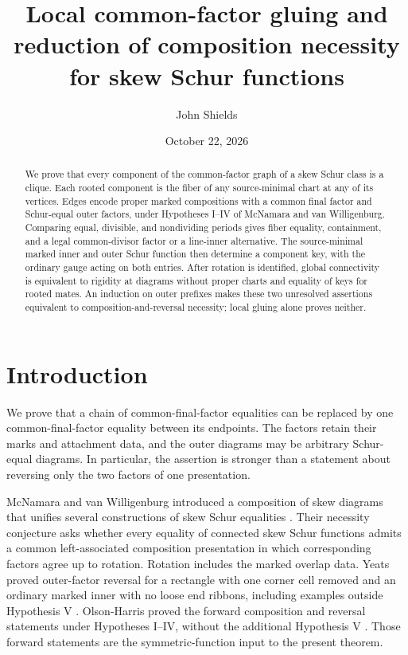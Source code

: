 \documentclass[11pt,a4paper]{amsart}
\title[Local common-factor gluing and necessity reduction]{Local common-factor gluing and reduction of composition necessity for skew Schur functions}
\author{John Shields}
\date{October 22, 2026}
\numberwithin{equation}{section}
\theoremstyle{plain}
\theoremstyle{definition}
\begin{document}
\begin{abstract}
We prove that every component of the common-factor graph of a skew Schur class is a clique.  Each rooted component is the fiber of any source-minimal chart at any of its vertices.  Edges encode proper marked compositions with a common final factor and Schur-equal outer factors, under Hypotheses I--IV of McNamara and van Willigenburg.  Comparing equal, divisible, and nondividing periods gives fiber equality, containment, and a legal common-divisor factor or a line-inner alternative.  The source-minimal marked inner and outer Schur function then determine a component key, with the ordinary gauge acting on both entries.  After rotation is identified, global connectivity is equivalent to rigidity at diagrams without proper charts and equality of keys for rooted mates.  An induction on outer prefixes makes these two unresolved assertions equivalent to composition-and-reversal necessity; local gluing alone proves neither.
\end{abstract}

\maketitle

\section{Introduction}\label{sec:introduction}

We prove that a chain of common-final-factor equalities can be replaced by one common-final-factor equality between its endpoints.  The factors retain their marks and attachment data, and the outer diagrams may be arbitrary Schur-equal diagrams.  In particular, the assertion is stronger than a statement about reversing only the two factors of one presentation.

McNamara and van Willigenburg introduced a composition of skew diagrams that unifies several constructions of skew Schur equalities \cite[Def.~3.11]{McNamara2009Classification}.  Their necessity conjecture \cite[Conjecture~5.7]{McNamara2009Classification} asks whether every equality of connected skew Schur functions admits a common left-associated composition presentation in which corresponding factors agree up to rotation.  Rotation includes the marked overlap data.  Yeats proved outer-factor reversal for a rectangle with one corner cell removed and an ordinary marked inner with no loose end ribbons, including examples outside Hypothesis V \cite[Thm.~13 and \S5]{Yeats2017HopfSchur}.  Olson-Harris proved the forward composition and reversal statements under Hypotheses I--IV, without the additional Hypothesis V \cite[Thms.~5.3.9 and~5.3.10]{OlsonHarris2024HopfApplications}.  Those forward statements are the symmetric-function input to the present theorem.
\end{document}
